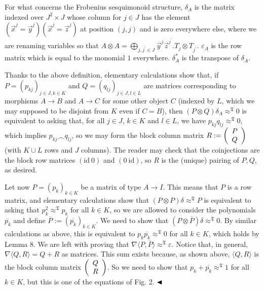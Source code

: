 \documentclass[10pt,a4paper]{amsart}
\begin{document}
 
 
For what concerns the Frobenius sesquimonoid structure, $\delta_{A}$ is the matrix indexed over $J^{2}\times J$ whose column for $j\in J$ has the element $(\vec{x}^{j}=\vec{y}^{j})(\vec{x}^{j}=\vec{z}^{j})$ at position $(j,j)$ and is zero everywhere else, where we are renaming variables so that $A\otimes A=\bigoplus_{j,j^{\prime}\in J}\vec{y}^{j}\vec{z}^{j^{\prime}}.T_{j}%
\otimes T_{j^{\prime}}$. $\varepsilon_{A}$ is the row matrix which is equal to the monomial $1$ everywhere. $\delta^{\ast}_{A}$ is the transpose of $\delta_{A}$.\par
 
 
 
Thanks to the above definition, elementary calculations show that, if $P=(p_{kj})_{j\in J,k\in K}$ and $Q=(q_{lj})_{j\in J,l\in L}$ are matrices corresponding to morphisms $A\to B$ and $A\to C$ for some other object $C$ (indexed by $L$, which we may supposed to be disjoint from $K$ even if $C=B$), then $(P\otimes Q)\delta_{A}\approx^{\mathfrak{T}}0$ is equivalent to asking that, for all $j\in J$, $k\in K$ and $l\in L$, we have $p_{kj}q_{lj}\approx^{\mathfrak{T}}0$, which implies $p_{kj}\frown q_{lj}$, so we may form the block column matrix $R:=\left(\begin{array}[]{c}P\\
Q\end{array}\right)$ (with $K\cup L$ rows and $J$ columns). The reader may check that the coinjections are the block row matrices $(\mathrm{id}\ 0)$ and $(0\ \mathrm{id})$, so $R$ is the (unique) pairing of $P,Q$, as desired.\par
 
 
 
Let now $P=(p_{k})_{k\in K}$ be a matrix of type $A\to I$. This means that $P$ is a row matrix, and elementary calculations show that $(P\otimes P)\delta\approx^{\mathfrak{T}}P$ is equivalent to asking that $p_{k}^{2}\approx^{\mathfrak{T}}p_{k}$ for all $k\in K$, so we are allowed to consider the polynomials $\overline{p_{k}}$ and define $\overline{P}:=(\overline{p_{k}})_{k\in K}$. We need to show that $(P\otimes\overline{P})\delta\approx^{\mathfrak{T}}0$. By similar calculations as above, this is equivalent to $p_{k}\overline{p_{k}}\approx^{\mathfrak{T}}0$ for all $k\in K$, which holds by Lemma 8. We are left with proving that $\nabla\langle P,\overline{P}\rangle\approx^{\mathfrak{T}}\varepsilon$. Notice that, in general, $\nabla\langle Q,R\rangle=Q+R$ as matrices. This sum exists because, as shown above, $\langle Q,R\rangle$ is the block column matrix $\left(\begin{array}[]{c}Q\\
R\end{array}\right)$. So we need to show that $p_{k}+\overline{p_{k}}\approx^{\mathfrak{T}}1$ for all $k\in K$, but this is one of the equations of Fig. 2. $\hfill\blacktriangleleft$\par
 
\end{document}
